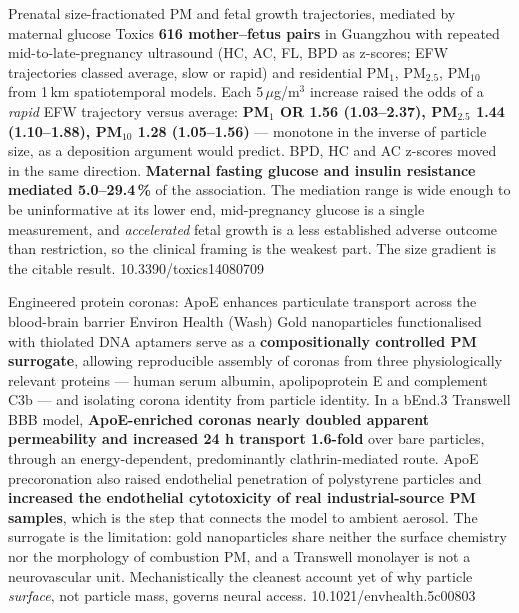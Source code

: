 \documentclass[10pt]{article}
\begin{document}
{Prenatal size-fractionated PM and fetal growth trajectories, mediated by maternal glucose}
{Toxics}
{\textbf{616 mother--fetus pairs} in Guangzhou with repeated mid-to-late-pregnancy
ultrasound (HC, AC, FL, BPD as z-scores; EFW trajectories classed average, slow or rapid)
and residential PM$_1$, PM$_{2.5}$, PM$_{10}$ from 1\,km spatiotemporal models. Each
5\,$\mu$g/m$^3$ increase raised the odds of a \emph{rapid} EFW trajectory versus average:
\textbf{PM$_1$ OR 1.56 (1.03--2.37), PM$_{2.5}$ 1.44 (1.10--1.88), PM$_{10}$ 1.28
(1.05--1.56)} --- monotone in the inverse of particle size, as a deposition argument would
predict. BPD, HC and AC z-scores moved in the same direction. \textbf{Maternal fasting
glucose and insulin resistance mediated 5.0--29.4\,\%} of the association. The mediation
range is wide enough to be uninformative at its lower end, mid-pregnancy glucose is a
single measurement, and \emph{accelerated} fetal growth is a less established adverse
outcome than restriction, so the clinical framing is the weakest part. The size gradient
is the citable result.}
{10.3390/toxics14080709}


{Engineered protein coronas: ApoE enhances particulate transport across the blood-brain barrier}
{Environ Health (Wash)}
{Gold nanoparticles functionalised with thiolated DNA aptamers serve as a
\textbf{compositionally controlled PM surrogate}, allowing reproducible assembly of
coronas from three physiologically relevant proteins --- human serum albumin,
apolipoprotein E and complement C3b --- and isolating corona identity from particle
identity. In a bEnd.3 Transwell BBB model, \textbf{ApoE-enriched coronas nearly doubled
apparent permeability and increased 24 h transport 1.6-fold} over bare particles, through
an energy-dependent, predominantly clathrin-mediated route. ApoE precoronation also
raised endothelial penetration of polystyrene particles and \textbf{increased the
endothelial cytotoxicity of real industrial-source PM samples}, which is the step that
connects the model to ambient aerosol. The surrogate is the limitation: gold
nanoparticles share neither the surface chemistry nor the morphology of combustion PM,
and a Transwell monolayer is not a neurovascular unit. Mechanistically the cleanest
account yet of why particle \emph{surface}, not particle mass, governs neural access.}
{10.1021/envhealth.5c00803}
\end{document}
